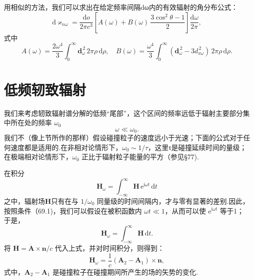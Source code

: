 用相似的方法，我们可以求出在给定频率间隔dω内的有效辐射的角分布公式：
\begin{equation}
  \mathrm{d}\varkappa_{n\omega}=\frac{\mathrm{d}o}{2\pi c^3}\left[A(\omega)+B(\omega)\,\frac{3\cos^2\theta-1}{2}\right]\frac{\mathrm{d}\omega}{2\pi},
\end{equation}
式中
\begin{equation}
  A(\omega)=\frac{2\omega^4}{3}\int_0^{\infty}\boldsymbol{d}_\omega^{\,2}\,2\pi\rho\,\mathrm{d}\rho,\quad
  B(\omega)=\frac{\omega^4}{3}\int_0^{\infty}(\boldsymbol{d}_\omega^{\,2}-3d_{x\omega}^{\,2})\,2\pi\rho\,\mathrm{d}\rho.
\end{equation}

\section{低频轫致辐射}

我们来考虑轫致辐射谱分解的低频“尾部”，这个区间的频率远低于辐射主要部分集中所在处的频率 $\omega_0$
\begin{equation}
  \omega\ll\omega_0.
\end{equation}
我们不（像上节所作的那样）假设碰撞粒子的速度远小于光速；下面的公式对于任何速度都是适用的.在非相对论情形下，$\omega_0\sim 1/\tau$，这里τ是碰撞延续时间的量级；在极端相对论情形下，$\omega_0$ 正比于辐射粒子能量的平方（参见§77).

在积分
\begin{equation*}
  \boldsymbol{H}_\omega=\int_{-\infty}^{\infty}\boldsymbol{H}\,\mathrm{e}^{\mathrm{i}\omega t}\,\mathrm{d}t
\end{equation*}
之中，辐射场$\boldsymbol{H}$只有在与 $1/\omega_0$ 同量级的时间间隔内，才与零有显著的差别.因此，按照条件（69.1)，我们可以假设在被积函数内 $\omega t\ll 1$，从而可以使 $\mathrm{e}^{\mathrm{i}\omega t}$ 等于1；于是，
\begin{equation*}
  \boldsymbol{H}_\omega=\int_{-\infty}^{\infty}\boldsymbol{H}\,\mathrm{d}t.
\end{equation*}
将 $\boldsymbol{H}=\dot{\boldsymbol{A}}\times\boldsymbol{n}/c$ 代入上式，并对时间积分，则得到：
\begin{equation}
  \boldsymbol{H}_\omega=\frac{1}{c}(\boldsymbol{A}_2-\boldsymbol{A}_1)\times\boldsymbol{n},
\end{equation}
式中，$\boldsymbol{A}_2-\boldsymbol{A}_1$ 是碰撞粒子在碰撞期间所产生的场的矢势的变化.

